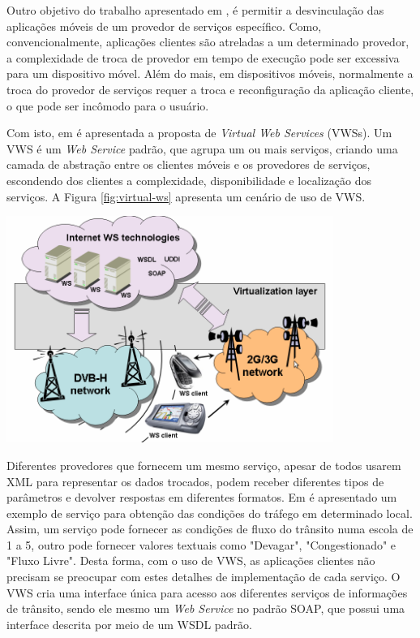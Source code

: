 Outro objetivo do trabalho apresentado em \cite{vilas2007providing}, é permitir a desvinculação das aplicações móveis de um provedor de serviços específico. Como, convencionalmente, aplicações clientes são atreladas a um determinado provedor, a complexidade de troca de provedor em tempo de execução pode ser excessiva para um dispositivo móvel. Além do mais, em dispositivos móveis, normalmente a troca do provedor de serviços requer a troca e reconfiguração da aplicação cliente, o que pode ser incômodo para o usuário.

Com isto, em \cite{vilas2007providing} é apresentada a proposta de \textit{Virtual Web Services} (VWSs). Um VWS é um \textit{Web Service} padrão, que agrupa um ou mais serviços, criando uma camada de abstração entre os clientes móveis e os provedores de serviços, escondendo dos clientes a complexidade, disponibilidade e localização dos serviços. A Figura \ref{fig:virtual-ws} apresenta um cenário de uso de VWS.

\begin{center}
	\includegraphics[width=0.8\textwidth]{images/virtual-ws-scenario.png}
	\label{fig:virtual-ws}
\end{center}

Diferentes provedores que fornecem um mesmo serviço, apesar de todos usarem XML para representar os dados trocados, podem receber diferentes tipos de parâmetros e devolver respostas em diferentes formatos. Em \cite{vilas2007providing} é apresentado um exemplo de serviço para obtenção das condições do tráfego em determinado local. Assim, um serviço pode fornecer as condições de fluxo do trânsito numa escola de 1 a 5, outro pode fornecer valores textuais como "Devagar", "Congestionado" e "Fluxo Livre". Desta forma, com o uso de VWS, as aplicações clientes não precisam se preocupar com estes detalhes de implementação de cada serviço. O VWS cria uma interface única para acesso aos diferentes serviços de informações de trânsito, sendo ele mesmo um \textit{Web Service} no padrão SOAP, que possui uma interface descrita por meio de um WSDL padrão.

